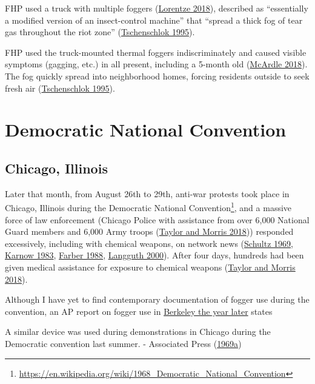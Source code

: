 \documentclass[
  11pt,
]{krantz}
\renewenvironment{quote}{\begin{VF}}{\end{VF}}
\renewcommand{\href}[2]{#2\footnote{\url{#1}}}
\begin{document}
FHP used a truck with multiple foggers (\protect\hyperlink{ref-Lorentzen2018}{Lorentze 2018}), described as ``essentially a modified version of an insect-control machine'' that ``spread a thick fog of tear gas throughout the riot zone'' (\protect\hyperlink{ref-Tschenschlok1995}{Tschenschlok 1995}).

FHP used the truck-mounted thermal foggers indiscriminately and caused visible symptoms (gagging, etc.) in all present, including a 5-month old (\protect\hyperlink{ref-McArdle2018}{McArdle 2018}).
The fog quickly spread into neighborhood homes, forcing residents outside to seek fresh air (\protect\hyperlink{ref-Tschenschlok1995}{Tschenschlok 1995}).

\hypertarget{democratic-national-convention}{%
\section{Democratic National Convention}\label{democratic-national-convention}}

\hypertarget{ChicagoIL1968_08_26}{%
\subsection{Chicago, Illinois}\label{ChicagoIL1968_08_26}}

Later that month, from August 26th to 29th, anti-war protests took place in Chicago, Illinois during the \href{https://en.wikipedia.org/wiki/1968_Democratic_National_Convention}{Democratic National Convention}, and a massive force of law enforcement (Chicago Police with assistance from over 6,000 National Guard members and 6,000 Army troops (\protect\hyperlink{ref-TaylorandMorris2018}{Taylor and Morris 2018})) responded excessively, including with chemical weapons, on network news (\protect\hyperlink{ref-Schultz1969}{Schultz 1969}, \protect\hyperlink{ref-Karnow1983}{Karnow 1983}, \protect\hyperlink{ref-Farber1988}{Farber 1988}, \protect\hyperlink{ref-Langguth2000}{Langguth 2000}).
After four days, hundreds had been given medical assistance for exposure to chemical weapons (\protect\hyperlink{ref-TaylorandMorris2018}{Taylor and Morris 2018}).

Although I have yet to find contemporary documentation of fogger use during the convention, an AP report on fogger use in \protect\hyperlink{BerkeleyCA1969_02_21}{Berkeley the year later} states

\begin{quote}
A similar device was used during demonstrations in Chicago during the Democratic convention last summer. - Associated Press (\protect\hyperlink{ref-TheDailyTribune1969_02_21}{1969a})
\end{quote}
\end{document}
